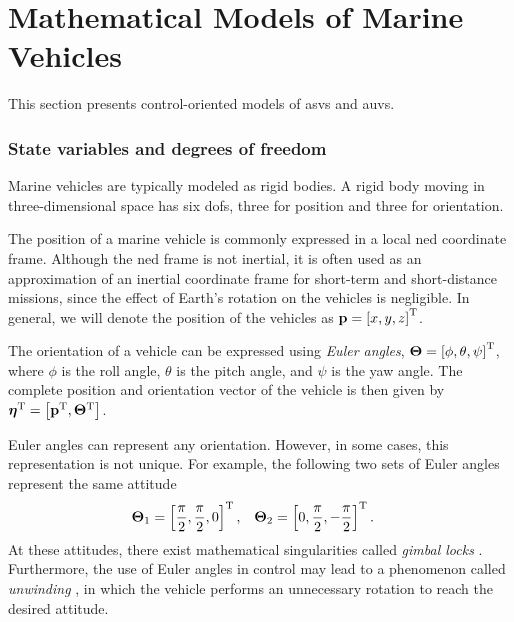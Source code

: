 \section{Mathematical Models of Marine Vehicles}
\label{sec:model}

This section presents control-oriented models of \glspl{asv} and \glspl{auv}.

\subsubsection*{State variables and degrees of freedom}
Marine vehicles are typically modeled as rigid bodies.
A rigid body moving in three-dimensional space has six \glspl{dof}, three for position and three for orientation.

The position of a marine vehicle is commonly expressed in a local \gls{ned} coordinate frame.
Although the \gls{ned} frame is not inertial, it is often used as an approximation of an inertial coordinate frame for short-term and short-distance missions, since the effect of Earth's rotation on the vehicles is negligible.
In general, we will denote the position of the vehicles as $\mathbf{p} = \left[x, y, z\right]^{\mathrm{T}}$.

The orientation of a vehicle can be expressed using \emph{Euler angles}, $\bm{\Theta} = \left[\phi, \theta, \psi\right]^{\mathrm{T}}$, where $\phi$ is the roll angle, $\theta$ is the pitch angle, and $\psi$ is the yaw angle.
The complete position and orientation vector of the vehicle is then given by $\bm{\eta}^{\mathrm{T}} = \left[\mathbf{p}^{\mathrm{T}}, \bm{\Theta}^{\mathrm{T}}\right]$.

Euler angles can represent any orientation.
However, in some cases, this representation is not unique.
For example, the following two sets of Euler angles represent the same attitude
\begin{align}
    \bm{\Theta}_1 &= \left[\frac{\pi}{2}, \frac{\pi}{2}, 0\right]^{\mathrm{T}}, &
    \bm{\Theta}_2 &= \left[0, \frac{\pi}{2}, -\frac{\pi}{2}\right]^{\mathrm{T}}. &
\end{align}
At these attitudes, there exist mathematical singularities called \emph{gimbal locks} \cite{chaturvedi_rigid-body_2011}.
Furthermore, the use of Euler angles in control may lead to a phenomenon called \emph{unwinding} \cite{sanjay_topological_2000}, in which the vehicle performs an unnecessary rotation to reach the desired attitude.

